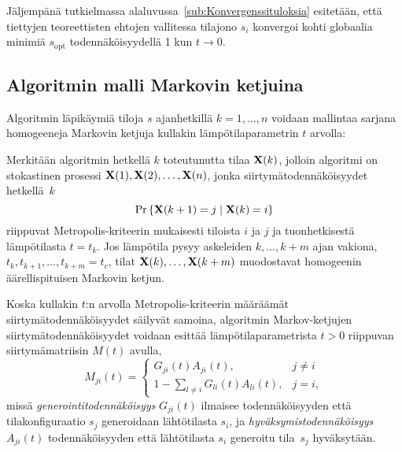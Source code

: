 Jäljempänä tutkielmassa alaluvussa~\ref{sub:Konvergenssituloksia} esitetään, että tiettyjen teoreettisten ehtojen vallitessa tilajono $s_i$ konvergoi kohti globaalia minimiä $s_\text{opt}$ todennäköisyydellä 1 kun $t \to 0$.


\subsection{Algoritmin malli Markovin ketjuina}
\label{sub:algoritmin_malli_markovin_ketjuina}

Algoritmin läpikäymiä tiloja $s$ ajanhetkillä $k = 1, \dots, n$ voidaan mallintaa sarjana homogeeneja Markovin ketjuja kullakin lämpötilaparametrin $t$ arvolla:

Merkitään algoritmin hetkellä $k$ toteutunutta tilaa $\mathbf{X}(k)$,
jolloin algoritmi on stokastinen prosessi $\mathbf{X}(1), \mathbf{X}(2), \dots, \mathbf{X}(n)$,
jonka siirtymätodennäköisyydet hetkellä $k$
\begin{equation}
    \Pr\left\{\mathbf{X}(k+1) = j \mid \mathbf{X}(k) = i\right\}
\end{equation}
riippuvat Metropolis-kriteerin mukaisesti tiloista $i$ ja $j$ ja tuonhetkisestä lämpötilasta $t = t_k$.
Jos lämpötila pysyy askeleiden $k, \dots, k + m$ ajan vakiona, $t_k, t_{k+1}, \dots, t_{k + m} = t_c$,
tilat $\mathbf{X}(k), \dots, \mathbf{X}(k+m)$ muodostavat homogeenin äärellispituisen Markovin ketjun.

Koska kullakin $t$:n arvolla Metropolis-kriteerin määräämät siirtymätodennäköisyydet säilyvät samoina,
algoritmin Markov-ketjujen siirtymätodennäköisyydet voidaan esittää lämpötilaparametrista $t > 0$ riippuvan siirtymämatriisin $M(t)$ avulla,
\begin{equation}
    \label{eq:siirtymamatriisi_maar}
    M_{ji}(t) =
    \begin{cases}
        G_{ji}(t)A_{ji}(t), & j \not= i \\
        1 - \sum_{l\not =i} G_{li}(t)A_{li}(t), & j = i,
    \end{cases}
\end{equation}
missä \emph{generointitodennäköisyys} $G_{ji}(t)$ ilmaisee todennäköisyyden että tilakonfiguraatio $s_j$ generoidaan lähtötilasta $s_i$, ja \emph{hyväksymistodennäköisyys} $A_{ji}(t)$ todennäköisyyden että lähtötilasta $s_i$ generoitu tila $s_j$ hyväksytään.

